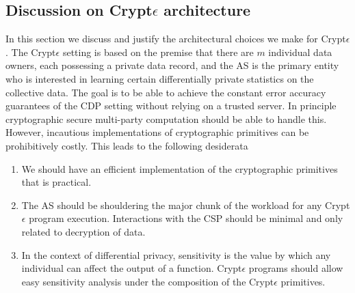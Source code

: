 \subsection{Discussion on Crypt$\epsilon$ architecture}
In this section we discuss and justify the architectural choices we make for Crypt$\epsilon$. The Crypt$\epsilon$ setting is based on the premise that there are $m$ individual data owners, each possessing a private data record, and the \textsf{AS} is the primary entity who is interested in learning certain differentially private statistics on the collective data. The goal is to be able to achieve the constant error accuracy guarantees of the \textsf{CDP} setting without relying on a trusted server. In principle cryptographic secure multi-party computation should be able to handle this. However, incautious implementations of cryptographic primitives can be prohibitively costly. This leads to the following desiderata
\begin{enumerate}\item We should have an efficient implementation of the cryptographic primitives that is practical. \item The \textsf{AS} should be shouldering the major chunk of the workload for any Crypt$\epsilon$ program execution. Interactions with the \textsf{CSP} should be minimal and only related to decryption of data. \item In the context of differential privacy, sensitivity is the value by which any individual can affect the output of a function. Crypt$\epsilon$ programs should allow easy sensitivity analysis under the composition of the Crypt$\epsilon$ primitives. \end{enumerate}  
